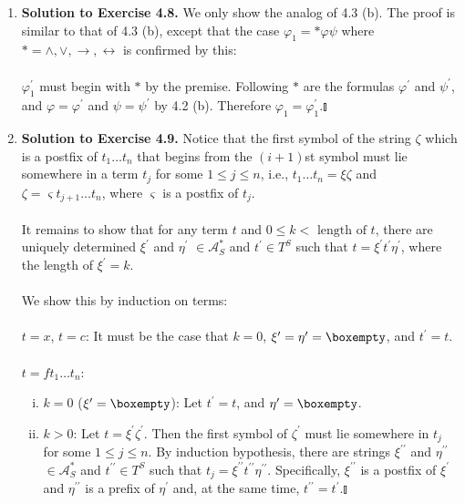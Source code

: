\begin{enumerate}[1.]
\item \textbf{Solution to Exercise 4.8.} We only show the analog of 4.3 (b). The proof is similar to that of 4.3 (b), except that the case $\varphi_1 = \ast \varphi \psi$ where $\ast = \land, \lor, \rightarrow, \leftrightarrow$ is confirmed by this: \\
\ 
\\$\varphi_1^\prime$ must begin with $\ast$ by the premise. Following $\ast$ are the formulas $\varphi^\prime$ and $\psi^\prime$, and $\varphi = \varphi^\prime$ and $\psi = \psi^\prime$ by 4.2 (b). Therefore $\varphi_1 = \varphi_1^\prime$.\nolinebreak\hfill$\talloblong$
%
\item \textbf{Solution to Exercise 4.9.} Notice that the first symbol of the string $\zeta$ which is a postfix of $t_1 \ldots t_n$ that begins from the $(i+1)$st symbol must lie somewhere in a term $t_j$ for some $1 \leq j \leq n$, i.e., $t_1 \ldots t_n = \xi \zeta$ and $\zeta = \varsigma t_{j+1} \ldots t_n$, where $\varsigma$ is a postfix of $t_j$. \\
\ 
\\It remains to show that for any term $t$ and $0 \leq k < \mbox{ length of } t$, there are uniquely determined $\xi^\prime$ and $\eta^\prime$ $\in \mathcal{A}_S^*$ and $t^\prime \in T^S$ such that $t = \xi^\prime t^\prime \eta^\prime$, where the length of $\xi^\prime = k$. \\
\ 
\\We show this by induction on terms: \\
\ 
\\$t = x$, $t = c$: It must be the case that $k = 0$, $\xi^\prime = \eta^\prime = \boxempty$, and $t^\prime = t$.\\
\ 
\\$t = ft_1 \ldots t_n$:
\begin{enumerate}[(i)]
\item $k = 0$ ($\xi^\prime = \boxempty$): Let $t^\prime = t$, and $\eta^\prime = \boxempty$.
\item $k > 0$: Let $t = \xi^\prime \zeta^\prime$. Then the first symbol of $\zeta^\prime$ must lie somewhere in $t_j$ for some $1 \leq j \leq n$. By induction bypothesis, there are strings $\xi^{\prime \prime}$ and $\eta^{\prime \prime}$ $\in \mathcal{A}_S^*$ and $t^{\prime \prime} \in T^S$ such that $t_j = \xi^{\prime \prime} t^{\prime \prime} \eta^{\prime \prime}$. Specifically, $\xi^{\prime \prime}$ is a postfix of $\xi^\prime$ and $\eta^{\prime \prime}$ is a prefix of $\eta^\prime$ and, at the same time, $t^{\prime \prime} = t^\prime$.\nolinebreak\hfill$\talloblong$
\end{enumerate}
\end{enumerate}
